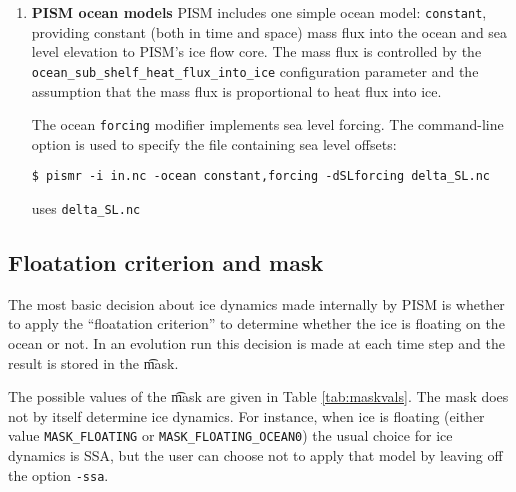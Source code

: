 \begin{enumerate}
\begin{itemize}
The number of positive degree days is multiplied by a coefficient (config parameter \texttt{pdd\und factor\und snow}) to compute the amount of snow melted.  Of the melted snow, a fraction (\texttt{pdd\und refreeze}) is kept as ice.  This ice, plus all unmelted snow (already measured as ice-equivalent) is added to the mass balance, unless the number of positive degree days exceeds that required to melt all of the snow.  In this latter case, in which there are excess positive degree days available for melting, the excess is multiplied by a coefficient (\texttt{pdd\und factor\und ice}) to compute how much ice is melted.  In this case actual ablation occurs at that location.

See also configuration parameters with the \texttt{pdd\und fausto} prefix.

 \end{itemize}
\item \textbf{PISM ocean models}
  PISM includes one simple ocean model: \verb|constant|, providing constant (both in time and space) mass flux into the ocean and sea level elevation to PISM's ice flow core. The mass flux is controlled by the\\ \verb|ocean_sub_shelf_heat_flux_into_ice| configuration parameter and the assumption that the mass flux is proportional to heat flux into ice.

  The ocean \texttt{forcing} modifier implements sea level forcing. The command-line option  is used to specify the file containing sea level offsets:
\begin{verbatim}
$ pismr -i in.nc -ocean constant,forcing -dSLforcing delta_SL.nc
\end{verbatim}%
uses \verb|delta_SL.nc|
\end{enumerate}
  
\subsection{Floatation criterion and mask} \label{subsect:floatmask}  The most basic decision about ice dynamics made internally by PISM is whether to apply the ``floatation criterion'' to determine whether the ice is floating on the ocean or not.  In an evolution run this decision is made at each time step and the result is stored in the \t{mask}.

The possible values of the \t{mask} are given in Table \ref{tab:maskvals}.  The mask does not by itself determine ice dynamics.  For instance, when ice is floating (either value \verb|MASK_FLOATING| or \verb|MASK_FLOATING_OCEAN0|) the usual choice for ice dynamics is SSA, but the user can choose not to apply that model by leaving off the option \verb|-ssa|.

